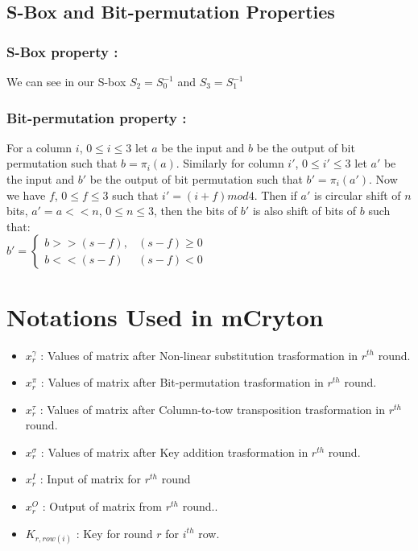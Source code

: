 \documentclass{transcrypto}
\begin{document}
	\subsection{S-Box and Bit-permutation Properties}
	\subsubsection{S-Box property :}
	We can see in our S-box $S_2 = S_0^{-1}$ and $S_3 = S_1^{-1}$
	\subsubsection{Bit-permutation property :}
	For a column $i$, $0\leq i\leq 3$ let $a$ be the input and $b$ be the output of bit permutation such that $b = \pi _{i}(a)$. Similarly for column $i'$, $0\leq i'\leq 3$ let $a'$ be the input and $b'$ be the output of bit permutation such that $b' = \pi _{i}(a')$. Now we have $f$, $0\leq f\leq 3$ such that $i' = (i + f)mod4$. Then  if $a'$ is circular shift of $n$ bits, $a' = a<<n$, $0\leq n\leq 3$, then the bits of $b'$  is also shift of bits of $b$ such that:\\
	
	$b'= 
	\begin{cases}
		b>>(s-f),& (s-f)\geq 0\\
		b<<(s-f)              & (s-f)<0
	\end{cases}$
	\section{Notations Used in mCryton}
	
	\begin{itemize}
		\item $x_r^{\gamma}$ : Values of matrix after Non-linear substitution trasformation in $r^{th}$ round.
		\item $x_r^{\pi}$ : Values of matrix after Bit-permutation trasformation in $r^{th}$ round.
		\item $x_r^{\tau}$ : Values of matrix after Column-to-tow transposition trasformation in $r^{th}$ round.
		\item $x_r^{\sigma}$ : Values of matrix after Key addition trasformation in $r^{th}$ round.
		\item $x_r^I$ : Input of matrix for $r^{th}$ round
		\item $x_r^O$ : Output of matrix from $r^{th}$ round..
		\item $K_{r, row(i)}$ : Key for round $r$ for $i^{th}$ row.
	\end{itemize}
\end{document}
